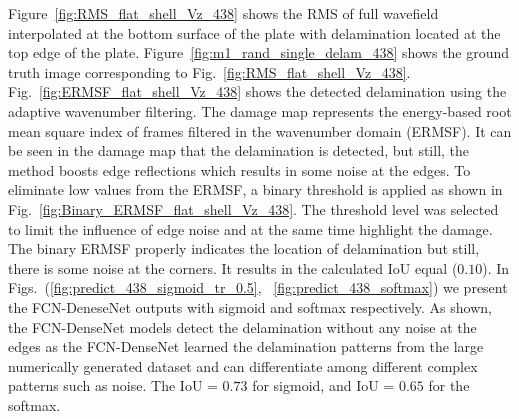 Figure~\ref{fig:RMS_flat_shell_Vz_438} shows the RMS of full wavefield interpolated at the bottom surface of the plate with delamination located at the top edge of the plate.
Figure~\ref{fig:m1_rand_single_delam_438} shows the ground truth image corresponding to Fig.~\ref{fig:RMS_flat_shell_Vz_438}. 
Fig.~\ref{fig:ERMSF_flat_shell_Vz_438} shows the detected delamination using the adaptive wavenumber filtering. 
The damage map represents the energy-based root mean square index of frames filtered in the wavenumber domain (ERMSF). 
It can be seen in the damage map that the delamination is detected, but still, the method boosts edge reflections which results in some noise at the edges. 
To eliminate low values from the ERMSF, a binary threshold is applied as shown in Fig.~\ref{fig:Binary_ERMSF_flat_shell_Vz_438}.
The threshold level was selected to limit the influence of edge noise and at the same time highlight the damage. 
The binary ERMSF properly indicates the location of delamination but still, there is some noise at the corners.
It results in the calculated IoU equal (\(0.10\)).
In Figs.~(\ref{fig:predict_438_sigmoid_tr_0.5}, ~\ref{fig:predict_438_softmax}) we present the FCN-DeneseNet outputs with sigmoid and softmax respectively.
As shown, the FCN-DenseNet models detect the delamination without any noise at the edges as the FCN-DenseNet learned the delamination patterns from the large numerically generated dataset and can differentiate among different complex patterns such as noise.   
The IoU = \(0.73\) for sigmoid, and IoU = \(0.65\) for the softmax.
